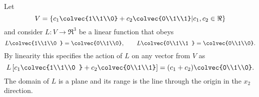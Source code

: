 \begin{example}\label{Vdef} Let \[V=\left\{  c_1\colvec{1\\1\\0} +c_2\colvec{0\\1\\1} \middle| c_1,c_2\in \Re \right\} \] and consider $L:V\to \Re^3$ be a linear function that obeys 
\[
L\colvec{1\\1\\0 } = \colvec{0\\1\\0},\qquad
L\colvec{0\\1\\1 } = \colvec{0\\1\\0}.
\]
By linearity this specifies the action of $L$ on any vector from $V$ as
\[
L\left[ c_1\colvec{1\\1\\0 } + c_2 \colvec{0\\1\\1} \right]= (c_1+c_2)\colvec{0\\1\\0}.
\]
The domain of $L$ is a plane and its range is the line through the origin in the $x_2$ direction. 



\end{example}
